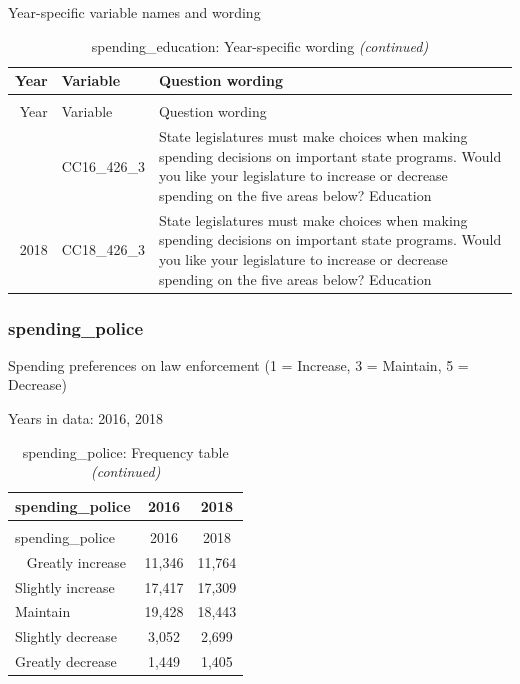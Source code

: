 \documentclass[12pt]{article}
\begin{document}
Year-specific variable names and wording

\begin{longtable}[t]{rl>{\raggedright\arraybackslash}p{10cm}}
\caption{\label{tab:unnamed-chunk-4}spending\_education: Year-specific wording}\\
\toprule
Year & Variable & Question wording\\
\midrule
\endfirsthead
\caption[]{spending\_education: Year-specific wording \textit{(continued)}}\\
\toprule
Year & Variable & Question wording\\
\midrule
\endhead
\
\endfoot
\bottomrule
\endlastfoot
2016 & CC16\_426\_3 & State legislatures must make choices when making spending decisions on important state programs. Would you like your legislature to increase or decrease spending on the five areas below? Education\\
2018 & CC18\_426\_3 & State legislatures must make choices when making spending decisions on important state programs. Would you like your legislature to increase or decrease spending on the five areas below? Education\\*
\end{longtable}

\subsubsection{spending\_police}\label{spending_police}

Spending preferences on law enforcement (1 = Increase, 3 = Maintain, 5 =
Decrease)

Years in data: 2016, 2018

\begin{longtable}[t]{lcc}
\caption{\label{tab:unnamed-chunk-4}spending\_police: Frequency table}\\
\toprule
spending\_police & 2016 & 2018\\
\midrule
\endfirsthead
\caption[]{spending\_police: Frequency table \textit{(continued)}}\\
\toprule
spending\_police & 2016 & 2018\\
\midrule
\endhead
\
\endfoot
\bottomrule
\endlastfoot
Greatly increase & 11,346 & 11,764\\
Slightly increase & 17,417 & 17,309\\
Maintain & 19,428 & 18,443\\
Slightly decrease & 3,052 & 2,699\\
Greatly decrease & 1,449 & 1,405\\*
\end{longtable}
\end{document}
